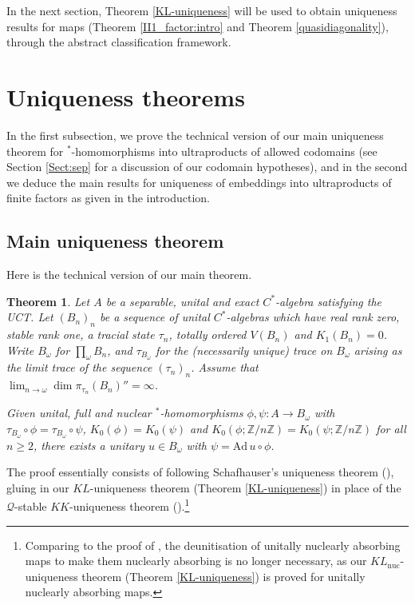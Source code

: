 \documentclass[reqno]{amsart}
\newtheorem{thm}{Theorem}[section]
\theoremstyle{definition}
\theoremstyle{remark}
\numberwithin{equation}{section}
\theoremstyle{definition}
\begin{document}
In the next section, Theorem \ref{KL-uniqueness} will be used to obtain uniqueness results for maps (Theorem \ref{II1_factor:intro} and Theorem \ref{quasidiagonality}), through the abstract classification framework. 

\section{Uniqueness theorems} 
\label{classification_chapter} 
In the first subsection, we prove the technical version of our main uniqueness theorem for $^*$-homomorphisms into ultraproducts of allowed codomains (see Section \ref{Sect:sep} for a discussion of our codomain hypotheses), and in the second we deduce the main results for uniqueness of embeddings into ultraproducts of finite factors as given in the introduction. 

\subsection{Main uniqueness theorem}

Here is the technical version of our main theorem.
\begin{thm} 
\label{MainUniqueness} 
Let $A$ be a separable, unital and exact $C^{\ast}$-algebra satisfying the UCT. Let $(B_n)_{n}$ be a sequence of unital $C^*$-algebras which have real rank zero, stable rank one, a tracial state $\tau_n$, totally ordered $V(B_{n})$ and $K_1(B_n)=0$. Write $B_{\omega}$ for $\prod_{\omega}B_{n}$, and $\tau_{B_\omega}$ for the (necessarily unique) trace on $B_\omega$ arising as the limit trace of the sequence $(\tau_n)_{n}$.  Assume that $\lim_{n\to\omega}\dim\pi_{\tau_n}(B_n)''=\infty$. 

Given unital, full and nuclear $^*$-homomorphisms $\phi,\psi\colon A\to B_\omega$ with $\tau_{B_\omega}\circ\phi=\tau_{B_\omega}\circ\psi$, $K_0(\phi)=K_0(\psi)$ and $K_0(\phi;\mathbb Z/n\mathbb Z)=K_0(\psi;\mathbb Z/n\mathbb Z)$ for all $n\geq 2$, there exists a unitary $u\in B_\omega$ with $\psi=\mathrm{Ad}\,u\circ\phi$.
\end{thm} 


The proof essentially consists of following Schafhauser's uniqueness theorem (\cite[Proposition 4.3]{Schafhauser.Annals}), gluing in our $KL$-uniqueness theorem (Theorem \ref{KL-uniqueness}) in place of the $\mathcal Q$-stable $KK$-uniqueness theorem (\cite[Proposition 2.7]{Schafhauser.Annals}).\footnote{Comparing to the proof of \cite[Proposition 4.3]{Schafhauser.Annals}, the deunitisation of unitally nuclearly absorbing maps to make them nuclearly absorbing is no longer necessary, as our $KL_{\mathrm{nuc}}$-uniqueness theorem (Theorem \ref{KL-uniqueness}) is proved for unitally nuclearly absorbing maps.}
\end{document}
